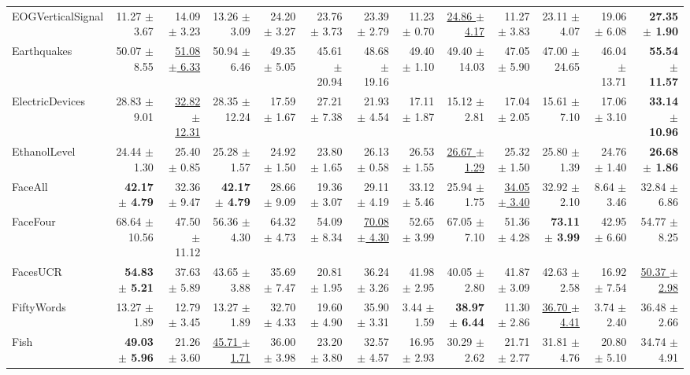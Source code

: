 \begin{landscape}
\begin{longtable}{lrrrrrrrrrrrr}
EOGVerticalSignal & 11.27 $\pm$ 3.67 & 14.09 $\pm$ 3.23 & 13.26 $\pm$ 3.09 & 24.20 $\pm$ 3.27 & 23.76 $\pm$ 3.73 & 23.39 $\pm$ 2.79 & 11.23 $\pm$ 0.70 & \underline{24.86 $\pm$ 4.17} & 11.27 $\pm$ 3.83 & 23.11 $\pm$ 4.07 & 19.06 $\pm$ 6.08 & \textbf{27.35 $\pm$ 1.90} \\
Earthquakes & 50.07 $\pm$ 8.55 & \underline{51.08 $\pm$ 6.33} & 50.94 $\pm$ 6.46 & 49.35 $\pm$ 5.05 & 45.61 $\pm$ 20.94 & 48.68 $\pm$ 19.16 & 49.40 $\pm$ 1.10 & 49.40 $\pm$ 14.03 & 47.05 $\pm$ 5.90 & 47.00 $\pm$ 24.65 & 46.04 $\pm$ 13.71 & \textbf{55.54 $\pm$ 11.57} \\
ElectricDevices & 28.83 $\pm$ 9.01 & \underline{32.82 $\pm$ 12.31} & 28.35 $\pm$ 12.24 & 17.59 $\pm$ 1.67 & 27.21 $\pm$ 7.38 & 21.93 $\pm$ 4.54 & 17.11 $\pm$ 1.87 & 15.12 $\pm$ 2.81 & 17.04 $\pm$ 2.05 & 15.61 $\pm$ 7.10 & 17.06 $\pm$ 3.10 & \textbf{33.14 $\pm$ 10.96} \\
EthanolLevel & 24.44 $\pm$ 1.30 & 25.40 $\pm$ 0.85 & 25.28 $\pm$ 1.57 & 24.92 $\pm$ 1.50 & 23.80 $\pm$ 1.65 & 26.13 $\pm$ 0.58 & 26.53 $\pm$ 1.55 & \underline{26.67 $\pm$ 1.29} & 25.32 $\pm$ 1.50 & 25.80 $\pm$ 1.39 & 24.76 $\pm$ 1.40 & \textbf{26.68 $\pm$ 1.86} \\
FaceAll & \textbf{42.17 $\pm$ 4.79} & 32.36 $\pm$ 9.47 & \textbf{42.17 $\pm$ 4.79} & 28.66 $\pm$ 9.09 & 19.36 $\pm$ 3.07 & 29.11 $\pm$ 4.19 & 33.12 $\pm$ 5.46 & 25.94 $\pm$ 1.75 & \underline{34.05 $\pm$ 3.40} & 32.92 $\pm$ 2.10 & 8.64 $\pm$ 3.46 & 32.84 $\pm$ 6.86 \\
FaceFour & 68.64 $\pm$ 10.56 & 47.50 $\pm$ 11.12 & 56.36 $\pm$ 4.30 & 64.32 $\pm$ 4.73 & 54.09 $\pm$ 8.34 & \underline{70.08 $\pm$ 4.30} & 52.65 $\pm$ 3.99 & 67.05 $\pm$ 7.10 & 51.36 $\pm$ 4.28 & \textbf{73.11 $\pm$ 3.99} & 42.95 $\pm$ 6.60 & 54.77 $\pm$ 8.25 \\
FacesUCR & \textbf{54.83 $\pm$ 5.21} & 37.63 $\pm$ 5.89 & 43.65 $\pm$ 3.88 & 35.69 $\pm$ 7.47 & 20.81 $\pm$ 1.95 & 36.24 $\pm$ 3.26 & 41.98 $\pm$ 2.95 & 40.05 $\pm$ 2.80 & 41.87 $\pm$ 3.09 & 42.63 $\pm$ 2.58 & 16.92 $\pm$ 7.54 & \underline{50.37 $\pm$ 2.98} \\
FiftyWords & 13.27 $\pm$ 1.89 & 12.79 $\pm$ 3.45 & 13.27 $\pm$ 1.89 & 32.70 $\pm$ 4.33 & 19.60 $\pm$ 4.90 & 35.90 $\pm$ 3.31 & 3.44 $\pm$ 1.59 & \textbf{38.97 $\pm$ 6.44} & 11.30 $\pm$ 2.86 & \underline{36.70 $\pm$ 4.41} & 3.74 $\pm$ 2.40 & 36.48 $\pm$ 2.66 \\
Fish & \textbf{49.03 $\pm$ 5.96} & 21.26 $\pm$ 3.60 & \underline{45.71 $\pm$ 1.71} & 36.00 $\pm$ 3.98 & 23.20 $\pm$ 3.80 & 32.57 $\pm$ 4.57 & 16.95 $\pm$ 2.93 & 30.29 $\pm$ 2.62 & 21.71 $\pm$ 2.77 & 31.81 $\pm$ 4.76 & 20.80 $\pm$ 5.10 & 34.74 $\pm$ 4.91 \\

\end{longtable}
\end{landscape}
